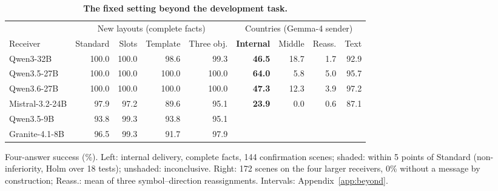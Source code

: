 \begin{table}[t]
\caption{\textbf{The fixed setting beyond the development task.}}
\label{tab:beyond}
\centering\small
\setlength{\tabcolsep}{3pt}\renewcommand{\arraystretch}{1.1}
\begin{tabular*}{\linewidth}{@{\extracolsep{\fill}}lrrrrrrrr@{}}
\toprule
 & \multicolumn{4}{c}{New layouts (complete facts)} & \multicolumn{4}{c}{Countries (Gemma-4 sender)} \\\cmidrule(lr){2-5}\cmidrule(l){6-9}
Receiver & Standard & Slots & Template & Three obj. & \textbf{Internal} & Middle & Reass. & Text \\
\midrule
Qwen3-32B & 100.0 & \cellcolor{parity}100.0 & \cellcolor{parity}98.6 & \cellcolor{parity}99.3 & \textbf{46.5} & 18.7 & 1.7 & 92.9 \\
Qwen3.5-27B & 100.0 & \cellcolor{parity}100.0 & \cellcolor{parity}100.0 & \cellcolor{parity}100.0 & \textbf{64.0} & 5.8 & 5.0 & 95.7 \\
Qwen3.6-27B & 100.0 & \cellcolor{parity}100.0 & \cellcolor{parity}100.0 & \cellcolor{parity}100.0 & \textbf{47.3} & 12.3 & 3.9 & 97.2 \\
Mistral-3.2-24B & 97.9 & \cellcolor{parity}97.2 & 89.6 & 95.1 & \textbf{23.9} & 0.0 & 0.6 & 87.1 \\
Qwen3.5-9B & 93.8 & \cellcolor{parity}99.3 & 93.8 & \cellcolor{parity}95.1 &  &  &  &  \\
Granite-4.1-8B & 96.5 & \cellcolor{parity}99.3 & 91.7 & \cellcolor{parity}97.9 &  &  &  &  \\
\bottomrule
\end{tabular*}
\par\vspace{3pt}
{\footnotesize\raggedright Four-answer success (\%). Left: internal delivery, complete facts, 144 confirmation scenes; shaded: within 5 points of Standard (non-inferiority, Holm over 18 tests); unshaded: inconclusive. Right: 172 scenes on the four larger receivers, 0\% without a message by construction; Reass.: mean of three symbol--direction reassignments. Intervals: Appendix~\ref{app:beyond}.\par}
\end{table}
